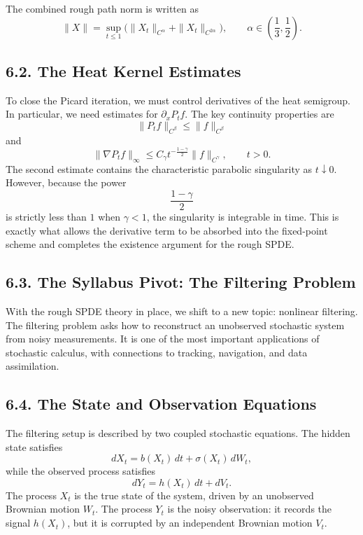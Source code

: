 \documentclass[11pt]{article}
\theoremstyle{definition}
\theoremstyle{remark}
\begin{document}
The combined rough path norm is written as
\[
\|X\|
=
\sup_{t\le 1}
\bigl(
\|X_t\|_{C^\alpha}
+
\|X_t\|_{C^{2\alpha}}
\bigr),
\qquad
\alpha\in\left(\frac13,\frac12\right).
\]

\subsection*{6.2. The Heat Kernel Estimates}
To close the Picard iteration, we must control derivatives of the heat semigroup. In particular, we need estimates for \(\partial_x P_tf\). The key continuity properties are
\[
\|P_tf\|_{C^\beta}\le \|f\|_{C^\beta}
\]
and
\[
\|\nabla P_tf\|_\infty
\le
C_\gamma t^{-\frac{1-\gamma}{2}}\|f\|_{C^\gamma},
\qquad t>0.
\]
The second estimate contains the characteristic parabolic singularity as \(t\downarrow 0\). However, because the power
\[
\frac{1-\gamma}{2}
\]
is strictly less than \(1\) when \(\gamma<1\), the singularity is integrable in time. This is exactly what allows the derivative term to be absorbed into the fixed-point scheme and completes the existence argument for the rough SPDE.

\subsection*{6.3. The Syllabus Pivot: The Filtering Problem}
With the rough SPDE theory in place, we shift to a new topic: nonlinear filtering. The filtering problem asks how to reconstruct an unobserved stochastic system from noisy measurements. It is one of the most important applications of stochastic calculus, with connections to tracking, navigation, and data assimilation.

\subsection*{6.4. The State and Observation Equations}
The filtering setup is described by two coupled stochastic equations. The hidden state satisfies
\[
dX_t=b(X_t)\,dt+\sigma(X_t)\,dW_t,
\]
while the observed process satisfies
\[
dY_t=h(X_t)\,dt+dV_t.
\]
The process \(X_t\) is the true state of the system, driven by an unobserved Brownian motion \(W_t\). The process \(Y_t\) is the noisy observation: it records the signal \(h(X_t)\), but it is corrupted by an independent Brownian motion \(V_t\).
\end{document}
